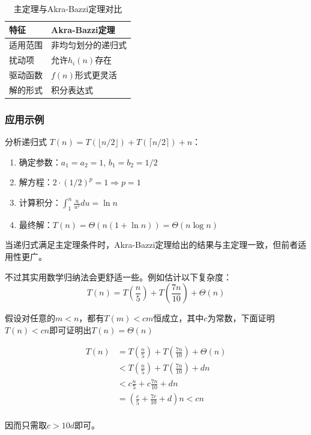 \documentclass[./../main.tex]{subfiles} %
\begin{document}
\begin{table}[h]
\centering
\caption{主定理与Akra-Bazzi定理对比}
\begin{tabular}{|l|l|}
\hline
\textbf{特征} & \textbf{Akra-Bazzi定理} \\ \hline
适用范围 & 非均匀划分的递归式 \\ \hline
扰动项 & 允许$h_i(n)$存在 \\ \hline
驱动函数 & $f(n)$形式更灵活 \\ \hline
解的形式 & 积分表达式 \\ \hline
\end{tabular}
\end{table}


\subsubsection{应用示例}
分析递归式 $T(n) = T(\lfloor n/2 \rfloor) + T(\lceil n/2 \rceil) + n$：
\begin{enumerate}
\item 确定参数：$a_1=a_2=1$, $b_1=b_2=1/2$
\item 解方程：$2\cdot(1/2)^p = 1 \Rightarrow p=1$
\item 计算积分：$\int_1^n \frac{u}{u^2}du = \ln n$
\item 最终解：$T(n) = \Theta(n(1 + \ln n)) = \Theta(n\log n)$
\end{enumerate}

当递归式满足主定理条件时，Akra-Bazzi定理给出的结果与主定理一致，但前者适用性更广。

不过其实用数学归纳法会更舒适一些。例如估计以下复杂度：
$$
T(n)=T(\frac{n}{5}) + T(\frac{7n}{10}) + \Theta(n)
$$

假设对任意的$m<n$，都有$T(m)<cm$恒成立，其中$c$为常数，下面证明$T(n)<cn$即可证明出$T(n)=\Theta(n)$

$$
\begin{aligned}
    T(n)&=T(\frac{n}{5}) + T(\frac{7n}{10}) + \Theta(n)\\
    &<T(\frac{n}{5}) + T(\frac{7n}{10}) + dn\\
    &<c\frac{n}{5} + c\frac{7n}{10} + dn\\
    &=(\frac{c}{5}+\frac{7c}{10}+d)n<cn\\
\end{aligned}
$$

因而只需取$c>10d$即可。
\end{document}
